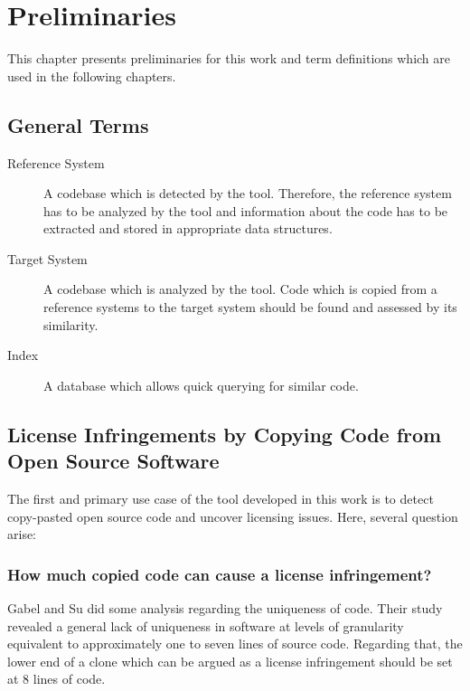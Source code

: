 
\chapter{Preliminaries}\label{chapter:preliminaries}
This chapter presents preliminaries for this work and term definitions which are used in the following chapters.

\section{General Terms}
\begin{description}
	\item[Reference System]
		A codebase which is detected by the tool. 
		Therefore, the reference system has to be analyzed by the tool and information about the code has to be extracted and stored in appropriate data structures.
	\item[Target System]
		A codebase which is analyzed by the tool. 
		Code which is copied from a reference systems to the target system should be found and assessed by its similarity.
	\item[Index] 
		A database which allows quick querying for similar code.
\end{description}

\section{License Infringements by Copying Code from Open Source Software}\label{section:preliminaries/infringement}
The first and primary use case of the tool developed in this work is to detect copy-pasted open source code and uncover licensing issues.
Here, several question arise:

\subsection*{How much copied code can cause a license infringement?}
Gabel and Su did some analysis regarding the uniqueness of code.
Their study \glqq revealed a general lack of uniqueness in software at levels of granularity equivalent to approximately one to seven lines of source code\grqq \cite{2010-gabel-su-source-code-uniqueness}.
Regarding that, the lower end of a clone which can be argued as a license infringement should be set at 8 lines of code.

